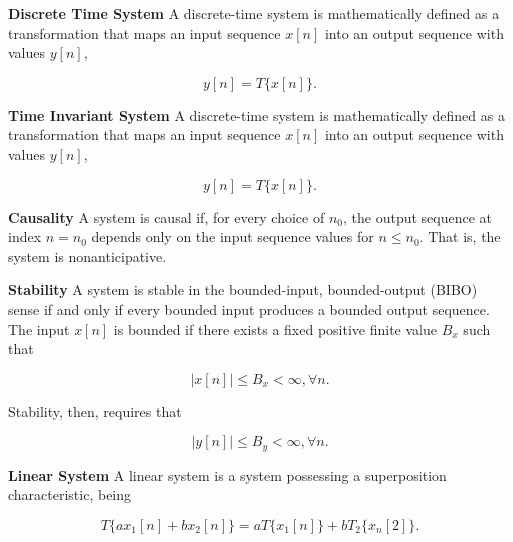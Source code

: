 \begin{defn}{\textbf{Discrete Time System}}
    A discrete-time system is mathematically defined as a transformation that maps an input sequence $x[n]$ into an output sequence with values $y[n]$,

    \begin{equation}
        y[n] = T\{x[n]\}.
    \end{equation}
\end{defn}

\begin{defn}{\textbf{Time Invariant System}}
    A discrete-time system is mathematically defined as a transformation that maps an input sequence $x[n]$ into an output sequence with values $y[n]$,

    \begin{equation}
        y[n] = T\{x[n]\}.
    \end{equation}
\end{defn}

\begin{defn}{\textbf{Causality}}
    A system is causal if, for every choice of $n_0$, the output sequence at index $n=n_0$ depends only on the input sequence values for $n \le n_0$. That is, the system is nonanticipative. 
\end{defn}

\begin{defn}{\textbf{Stability}}
    A system is stable in the bounded-input, bounded-output (BIBO) sense if and only if every bounded input produces a bounded output sequence. The input $x[n]$ is bounded if there exists a fixed positive finite value $B_x$ such that
    
    \begin{equation}
        |x[n]| \le B_x < \infty, \forall n.
    \end{equation}

    Stability, then, requires that

    \begin{equation}
        |y[n]| \le B_y < \infty, \forall n.
    \end{equation}
\end{defn}

\begin{defn}{\textbf{Linear System}}
    A linear system is a system possessing a superposition characteristic, being

    \begin{equation}
        T\{ a x_1[n] + b x_2[n] \} = a T\{x_1[n]\} + b T_2 \{ x_n[2]\}.
    \end{equation}
\end{defn}

